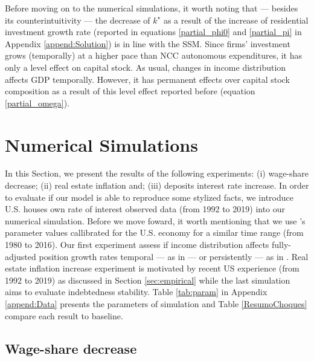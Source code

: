 \documentclass[11pt]{article}
\begin{document}
Before moving on to the numerical simulations, it worth noting that --- besides its counterintuitivity --- the decrease of \(k^{\star}\) as a result of the increase of residential investment growth rate (reported in equations \ref{partial_phi0} and \ref{partial_pi} in Appendix \ref{append:Solution}) is in line with the SSM.
Since firms' investment grows (temporally) at a higher pace than NCC autonomous expenditures, it has only a level effect on capital stock.
As usual, changes in income distribution affects GDP temporally.
However, it has permanent effects over capital stock composition as a result of this level effect reported before (equation \ref{partial_omega}).


\section{Numerical Simulations}
\label{sec:org298e93d}
\label{sec:Experiments}
\label{sec:Experiments}


In this Section, we present the results of the following experiments: 
    (i) wage-share decrease;
    (ii) real estate inflation and;
    (iii) deposits interest rate increase.
In order to evaluate if our model is able to reproduce some stylized facts, we introduce U.S. houses own rate of interest observed data (from 1992 to 2019) into our numerical simulation.
Before we move foward, it worth mentioning that we use \citeauthor*{fazzari-2020-deman-led}'s  \citeyear{fazzari-2020-deman-led} parameter values callibrated for the U.S. economy for a similar time range (from 1980 to 2016).
Our first experiment assess if income distribution affects fully-adjusted position growth rates temporal --- as in \textcite{mandarino-2020-worker-debt} --- or persistently ---  as in \textcite{brochier_supermultiplier_2018}.
Real estate inflation increase experiment is motivated by recent US experience (from 1992 to 2019) as discussed in Section \ref{sec:empirical} while the last simulation aims to evaluate indebtedness stability.
Table \ref{tab:param} in Appendix \ref{append:Data} presents the parameters of simulation and Table \ref{ResumoChoques} compare each result to baseline.
\subsection{Wage-share decrease}
\label{sec:org877967e}
\label{sec:Exp1}
\end{document}
